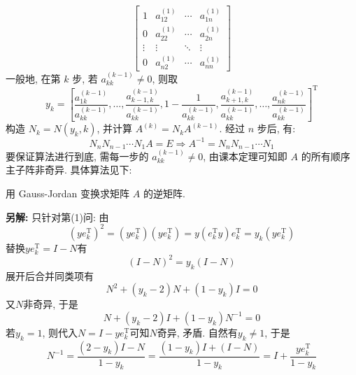 \documentclass[12pt, answers]{exam}     %
\newcommand{\anothersolution}{\par\noindent\textbf{另解:}}
\newcommand{\T}{\mathrm{T}}
\begin{document}
\begin{questions}
\begin{solution}
\begin{enumerate}[label=(\arabic*)]
\[    \begin{bmatrix}
    1 & a_{12}^{(1)} & \cdots & a_{1n}^{(1)} \\
    0 & a_{22}^{(1)} & \cdots & a_{2n}^{(1)} \\
    \vdots & \vdots & \ddots & \vdots \\
    0 & a_{n2}^{(1)} & \cdots & a_{nn}^{(1)}
    \end{bmatrix}
    \]
    一般地, 在第 \( k \) 步, 若 \( a_{kk}^{(k-1)} \neq 0 \), 则取
    \[
    y_k = \left[ \frac{a_{1k}^{(k-1)}}{a_{kk}^{(k-1)}}, \ldots, \frac{a_{k-1,k}^{(k-1)}}{a_{kk}^{(k-1)}}, 1 - \frac{1}{a_{kk}^{(k-1)}}, \frac{a_{k+1,k}^{(k-1)}}{a_{kk}^{(k-1)}}, \ldots, \frac{a_{nk}^{(k-1)}}{a_{kk}^{(k-1)}} \right]^{\T}
    \]
    构造 \( N_k = N(y_k, k) \), 并计算 \( A^{(k)} = N_k A^{(k-1)} \). 经过 \( n \) 步后, 有: 
    \[
    N_n N_{n-1} \cdots N_1 A = E \Rightarrow
    A^{-1} = N_n N_{n-1} \cdots N_1
    \]
    要保证算法进行到底, 需每一步的 \( a_{kk}^{(k-1)} \neq 0 \), 由课本定理可知即 \( A \) 的所有顺序主子阵非奇异. 具体算法见下:
\end{enumerate}
\begin{algorithm}[H]
\caption{用 Gauss-Jordan 变换求矩阵 $A$ 的逆矩阵.}
\end{algorithm}
\anothersolution{}
只针对第(1)问: 由 \[(y e_k^{\T})^2 = (y e_k^{\T})(y e_k^{\T}) = y (e_k^{\T} y) e_k^{\T} = y_k (y e_k^{\T})\]
替换$y e_k^{\T} = I - N$有
\[ (I - N)^2 = y_k (I - N) \]
展开后合并同类项有
\[ N^2 + (y_k - 2)N + (1 - y_k)I = 0 \]
又$N$非奇异, 于是
\[ N + (y_k - 2)I + (1 - y_k)N^{-1} = 0 \]
若$y_k = 1$, 则代入$N = I - y e_k^{\T}$可知$N$奇异, 矛盾. 自然有$y_k \neq 1$, 于是
\[ N^{-1} = \frac{(2 - y_k)I - N}{1 - y_k} = \frac{(1 - y_k)I + (I - N)}{1 - y_k} = I + \frac{y e_k^{\T}}{1 - y_k} \]
\end{solution}


\end{questions}
\end{document}
